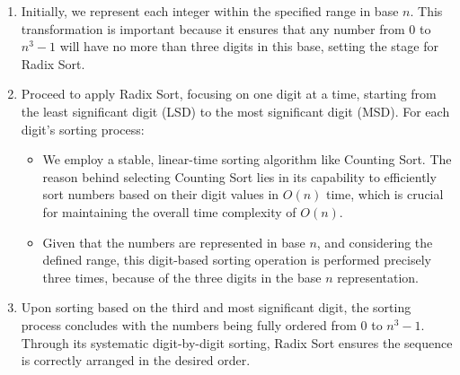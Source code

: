 \documentclass[11pt]{article}
\theoremstyle{definition}
\begin{document}
\begin{enumerate}
    \item Initially, we represent each integer within the specified range in base \(n\). This transformation is important because it ensures that any number from \(0\) to \(n^3 - 1\) will have no more than three digits in this base, setting the stage for Radix Sort.

    \item Proceed to apply Radix Sort, focusing on one digit at a time, starting from the least significant digit (LSD) to the most significant digit (MSD). For each digit's sorting process:
    \begin{itemize}
        \item We employ a stable, linear-time sorting algorithm like Counting Sort. The reason behind selecting Counting Sort lies in its capability to efficiently sort numbers based on their digit values in \(O(n)\) time, which is crucial for maintaining the overall time complexity of \(O(n)\).
        \item Given that the numbers are represented in base \(n\), and considering the defined range, this digit-based sorting operation is performed precisely three times, because of the three digits in the base \(n\) representation.
    \end{itemize}

    \item Upon sorting based on the third and most significant digit, the sorting process concludes with the numbers being fully ordered from \(0\) to \(n^3 - 1\). Through its systematic digit-by-digit sorting, Radix Sort ensures the sequence is correctly arranged in the desired order.
\end{enumerate}
\end{document}
